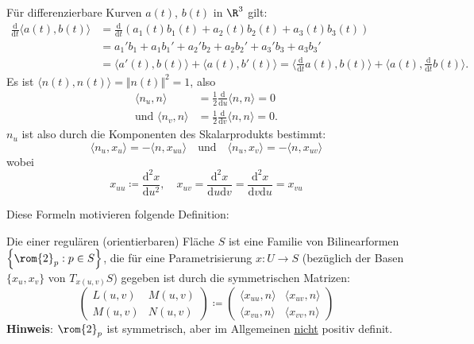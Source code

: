 \begin{remark}[Zwischenbemerkung]
  Für differenzierbare Kurven \( a(t) \), \( b(t) \) in \( \R^3 \) gilt:
  \begin{align*}
    \frac{\text{d}}{\text{d}t}\langle a(t), b(t) \rangle &= \frac{\text{d}}{\text{d}t}\left( a_1(t)b_1(t)+a_2(t)b_2(t)+a_3(t)b_3(t) \right) \\
     &= a_1'b_1+a_1b_1'+a_2'b_2+a_2b_2' + a_3'b_3+a_3b_3' \\
     &= \langle a'(t),b(t) \rangle + \langle a(t),b'(t) \rangle = \langle \frac{\text{d}}{\text{d} t}a(t),b(t) \rangle + \langle a(t), \frac{\text{d}}{\text{d}t}b(t) \rangle\text{.}
  \end{align*}
  Es ist \( \langle n(t),n(t) \rangle = \Vert n(t) \Vert^2 = 1 \), also
  \begin{align*}
    \langle n_u,n \rangle &= \frac{1}{2}\frac{\text{d}}{\text{d}u}\langle n,n \rangle = 0 \\
    \text{und } \langle n_v,n \rangle &= \frac{1}{2}\frac{\text{d}}{\text{d}v}\langle n,n \rangle = 0\text{.}
  \end{align*}
  \( n_u \) ist also durch die Komponenten des Skalarprodukts bestimmt:
  \begin{equation*}
    \langle n_u,x_u \rangle = -\langle n,x_{uu} \rangle \quad \text{und} \quad \langle n_u,x_v \rangle = - \langle n,x_{uv} \rangle
  \end{equation*}
  wobei
  \begin{equation*}
    x_{uu} \coloneqq \frac{\text{d}^2x}{\text{d}u^2}, \quad x_{uv}= \frac{\text{d}^2x}{\text{d}u\text{d}v} = \frac{\text{d}^2x}{\text{d}v\text{d}u} = x_{vu}
  \end{equation*}
\end{remark}

Diese Formeln motivieren folgende Definition:

\begin{definition}[2. Fundamentalform]
  Die \label{def:zweiteFundamentalform} einer regulären (orientierbaren) Fläche \( S \) ist eine Familie von Bilinearformen \( \left \{ \rom{2}_p : p \in S \right \} \), die für eine Parametrisierung \( x: U \to S \) (bezüglich der Basen \( \{ x_u, x_v \} \) von \( T_{x(u,v)}S \)) gegeben ist durch die symmetrischen Matrizen:
  \begin{equation*}
    \begin{pmatrix}
      L(u,v) & M(u,v) \\
      M(u,v) & N(u,v)
    \end{pmatrix} \coloneqq \begin{pmatrix}
      \langle x_{uu},n \rangle & \langle x_{uv},n \rangle \\
      \langle x_{vu},n \rangle & \langle x_{vv},n \rangle
    \end{pmatrix}
  \end{equation*}
  \textbf{Hinweis}: \( \rom{2}_p \) ist symmetrisch, aber im Allgemeinen \underline{nicht} positiv definit.
\end{definition}

